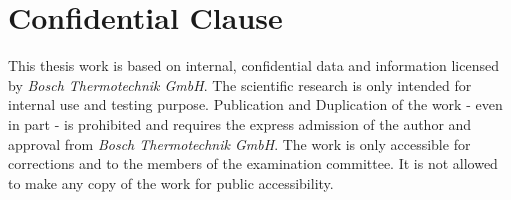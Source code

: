 \chapter*{Confidential Clause}
    \noindent This thesis work is based on internal, confidential data and information licensed by \textit {Bosch Thermotechnik GmbH}. The scientific research is only intended for internal use and testing purpose. Publication and Duplication of the work - even in part - is prohibited and requires the express admission of the author and approval from \textit {Bosch Thermotechnik GmbH}. The work is only accessible for corrections and to the members of the examination committee. It is not allowed to make any copy of the work for public accessibility.